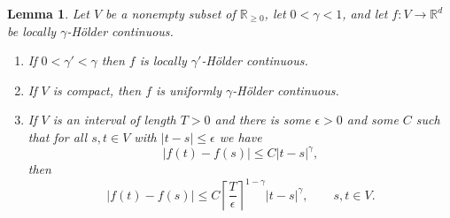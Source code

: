 \documentclass{article}
\newtheorem{lemma}[theorem]{Lemma}
\theoremstyle{definition}
\begin{document}
\begin{lemma}
Let $V$ be a nonempty subset of $\mathbb{R}_{\geq 0}$, let $0<\gamma<1$, and let
$f:V \to \mathbb{R}^d$ be locally $\gamma$-H\"older continuous. 
\begin{enumerate}
\item If $0<\gamma'<\gamma$ then $f$ is locally $\gamma'$-H\"older continuous.
\item If $V$ is compact, then $f$ is uniformly $\gamma$-H\"older continuous.
\item If $V$ is an interval of length $T>0$ and there is some $\epsilon>0$ and some $C$ such that for all
$s,t \in V$ with $|t-s| \leq \epsilon$ we have
\begin{equation}
|f(t)-f(s)| \leq C |t-s|^\gamma,
\label{epsilon}
\end{equation}
then
\[
|f(t)-f(s)| \leq C \left\lceil \frac{T}{\epsilon} \right\rceil^{1-\gamma}  |t-s|^\gamma, \qquad s,t \in V.
\]
\end{enumerate}
\end{lemma}
\end{document}
